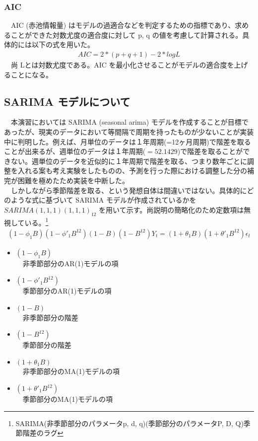 \documentclass{scrartcl}
\begin{document}
\subsubsection{AIC}
\label{sec:orgb3eb3c6}
　AIC (赤池情報量) はモデルの過適合などを判定するための指標であり、求めることができた対数尤度の適合度に対して p, q の値を考慮して計算される。具体的には以下の式を用いた。\\
\begin{align}
AIC = 2 * (p + q + 1) - 2 * log L
\end{align}
　尚 Lとは対数尤度である。AIC を最小化させることがモデルの適合度を上げることになる。\\
\subsection{SARIMA モデルについて}
\label{sec:orgf282bf4}
　本演習においては SARIMA (seasonal arima) モデルを作成することが目標であったが、現実のデータにおいて等間隔で周期を持ったものが少ないことが実装中に判明した。例えば、月単位のデータは１年周期(=12ヶ月周期)で階差を取ることが出来るが、週単位のデータは１年周期(\(=52.1429\))で階差を取ることができない。週単位のデータを近似的に１年周期で階差を取る、つまり数年ごとに調整を入れる案も考え実験をしたものの、予測を行った際における調整した分の補完が困難を極めたため実装を中断した。\\
　しかしながら季節階差を取る、という発想自体は間違いではない。具体的にどのような式に基づいて SARIMA モデルが作成されているかを \(SARIMA(1,1,1)(1,1,1)_{12}\) を用いて示す。尚説明の簡略化のため定数項は無視している。\footnote{SARIMA(非季節部分のパラメータp, d, q)(季節部分のパラメータP, D, Q){季節階差のラグ}}
\begin{align}
(1-\phi_1 B)(1-\phi'_1B^{12})(1-B)(1-B^{12})Y_t = (1+\theta_1B)(1+\theta'_1B^{12})\epsilon_t
\end{align}
\begin{itemize}
\item \((1-\phi_1 B)\) \\
　非季節部分のAR(1)モデルの項\\
\item \((1-\phi'_1B^{12})\)\\
　季節部分のAR(1)モデルの項\\
\item \((1-B)\)\\
　非季節部分の階差\\
\item \((1-B^{12})\)\\
　季節部分の階差\\
\item \((1+\theta_1B)\)\\
　非季節部分のMA(1)モデルの項\\
\item \((1+\theta'_1B^{12})\)\\
　季節部分のMA(1)モデルの項\\
\end{itemize}
\end{document}
